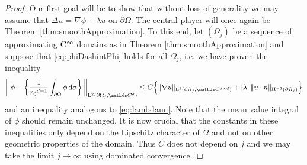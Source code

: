 \begin{proof}
  Our first goal will be to show that without loss of generality we may assume that $\Delta u = \nabla \phi + \lambda u$ on $\partial\Omega$.
  The central player will once again be Theorem \ref{thm:smoothApproximation}.
  To this end, let $(\Omega_j)$ be a sequence of approximating $\mathrm{C}^\infty$ domains as in Theorem \ref{thm:smoothApproximation} and suppose that
  \ref{eq:phiDashintPhi} holds for all $\Omega_j$, i.e. we have proven the inequality
  \begin{align}
    \label{eq:phiDashintPhij}
    \bigg\|\, \phi - \bigg\{ \frac{1}{{r_0}^{d - 1}}\int_{\partial\Omega} \phi \d\sigma \bigg\} \, \bigg\|_{\Ell^2(\partial\Omega_j; \C^d)}
     \leq C \Big\{ \|\nabla u\|_{\Ell^2(\partial\Omega_j; \C^{d\times d})} + |\lambda| \, \|u\cdot n\|_{\HH^{-1}(\partial\Omega_j)} \Big\}
  \end{align}
  and an inequality analogous to \eqref{eq:lambdaun}.
  Note that the mean value integral of $\phi$ should remain unchanged.
  It is now crucial that the constants in these inequalities only depend on the Lipschitz character of $\Omega$ and not on other geometric properties of the domain.
  Thus $C$ does not depend on $j$ and we may take the limit $j \to \infty$ using dominated convergence.


\end{proof}
